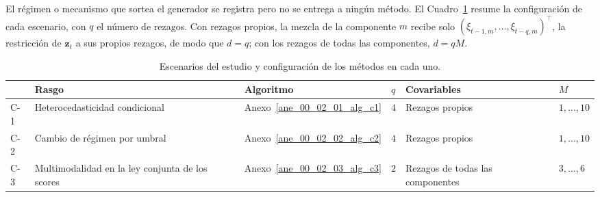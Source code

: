 El régimen o mecanismo que sortea el generador se registra pero no se entrega a ningún método. El Cuadro~\ref{tab:dis_escenarios} resume la configuración de cada escenario, con $q$ el número de rezagos. Con rezagos propios, la mezcla de la componente $m$ recibe solo $(\xi_{t-1,m}, \dots, \xi_{t-q,m})^\top$, la restricción de $\mathbf{z}_t$ a sus propios rezagos, de modo que $d = q$; con los rezagos de todas las componentes, $d = qM$.

\begin{table}[H]
\centering\small
\setlength{\tabcolsep}{4pt}
\caption{Escenarios del estudio y configuración de los métodos en cada uno.}
\label{tab:dis_escenarios}
\begin{tabular}{p{} p{} p{} p{} p{} p{}}
\hline
 & Rasgo & Algoritmo & $q$ & Covariables & $M$ \\
\hline
C-1 & Heterocedasticidad condicional        & Anexo~\ref{ane_00_02_01_alg_c1} & $4$ & Rezagos propios                       & $1,\ldots,10$ \\
C-2 & Cambio de régimen por umbral          & Anexo~\ref{ane_00_02_02_alg_c2} & $4$ & Rezagos propios                       & $1,\ldots,10$ \\
C-3 & Multimodalidad en la ley conjunta de los scores & Anexo~\ref{ane_00_02_03_alg_c3} & $2$ & Rezagos de todas las componentes & $3,\ldots,6$ \\
\hline
\end{tabular}
\end{table}

